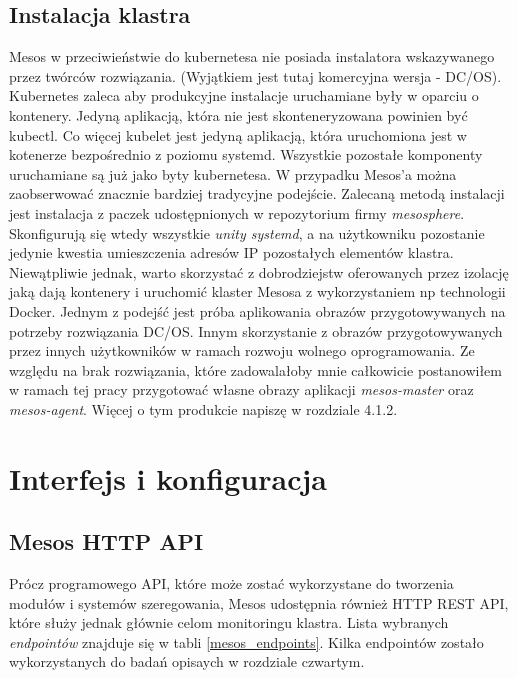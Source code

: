 \documentclass[10pt,a4paper,titlepage,twoside]{report}
\begin{document}
\subsection{Instalacja klastra}
Mesos w przeciwieństwie do kubernetesa nie posiada instalatora wskazywanego przez twórców rozwiązania. (Wyjątkiem jest tutaj komercyjna wersja - DC/OS). Kubernetes zaleca aby produkcyjne instalacje uruchamiane były w oparciu o kontenery. Jedyną aplikacją, która nie jest skonteneryzowana powinien być kubectl. Co więcej kubelet jest jedyną aplikacją, która uruchomiona jest w kotenerze bezpośrednio z poziomu systemd. Wszystkie pozostałe komponenty uruchamiane są już jako byty kubernetesa. W przypadku Mesos'a można zaobserwować znacznie bardziej tradycyjne podejście. Zalecaną metodą instalacji jest instalacja z paczek udostępnionych w repozytorium firmy \textit{mesosphere}. Skonfigurują się wtedy wszystkie \textit{unity systemd}, a na użytkowniku pozostanie jedynie kwestia umieszczenia adresów IP pozostałych elementów klastra. Niewątpliwie jednak, warto skorzystać z dobrodziejstw oferowanych przez izolację jaką dają kontenery i uruchomić klaster Mesosa z wykorzystaniem np technologii Docker. Jednym z podejść jest próba aplikowania obrazów przygotowywanych na potrzeby rozwiązania DC/OS. Innym skorzystanie z obrazów przygotowywanych przez innych użytkowników w ramach rozwoju wolnego oprogramowania. Ze względu na brak rozwiązania, które zadowalałoby mnie całkowicie postanowiłem w ramach tej pracy przygotować własne obrazy aplikacji \textit{mesos-master} oraz \textit{mesos-agent}. Więcej o tym produkcie napiszę w rozdziale 4.1.2.

\section{Interfejs i konfiguracja}
\subsection{Mesos HTTP API}
Prócz programowego API, które może zostać wykorzystane do tworzenia modułów i systemów szeregowania, Mesos udostępnia również HTTP REST API, które służy jednak głównie celom monitoringu klastra. Lista wybranych \textit{endpointów} znajduje się w tabli \ref{mesos_endpoints}.  Kilka endpointów zostało wykorzystanych do badań opisaych w rozdziale czwartym. 
\end{document}

